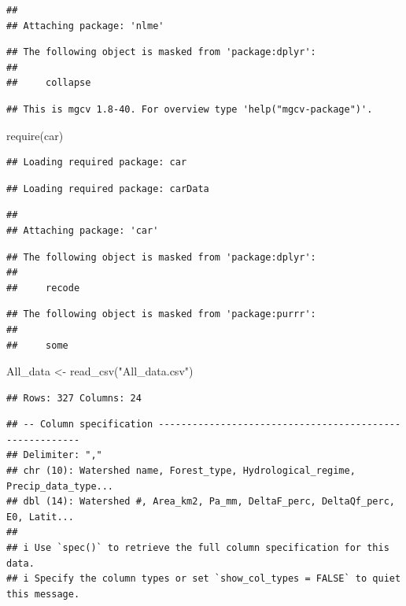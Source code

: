 \documentclass[]{elsarticle} %
\newenvironment{Shaded}{\begin{snugshade}}{\end{snugshade}}
\newcommand{\FunctionTok}[1]{\textcolor[rgb]{0.00,0.00,0.00}{#1}}
\newcommand{\NormalTok}[1]{#1}
\newcommand{\OtherTok}[1]{\textcolor[rgb]{0.56,0.35,0.01}{#1}}
\newcommand{\StringTok}[1]{\textcolor[rgb]{0.31,0.60,0.02}{#1}}
\begin{document}
\begin{verbatim}
## 
## Attaching package: 'nlme'
\end{verbatim}

\begin{verbatim}
## The following object is masked from 'package:dplyr':
## 
##     collapse
\end{verbatim}

\begin{verbatim}
## This is mgcv 1.8-40. For overview type 'help("mgcv-package")'.
\end{verbatim}

\begin{Shaded}
\begin{Highlighting}[]
\FunctionTok{require}\NormalTok{(car)}
\end{Highlighting}
\end{Shaded}

\begin{verbatim}
## Loading required package: car
\end{verbatim}

\begin{verbatim}
## Loading required package: carData
\end{verbatim}

\begin{verbatim}
## 
## Attaching package: 'car'
\end{verbatim}

\begin{verbatim}
## The following object is masked from 'package:dplyr':
## 
##     recode
\end{verbatim}

\begin{verbatim}
## The following object is masked from 'package:purrr':
## 
##     some
\end{verbatim}

\begin{Shaded}
\begin{Highlighting}[]
\NormalTok{All\_data }\OtherTok{\textless{}{-}} \FunctionTok{read\_csv}\NormalTok{(}\StringTok{"All\_data.csv"}\NormalTok{)}
\end{Highlighting}
\end{Shaded}

\begin{verbatim}
## Rows: 327 Columns: 24
\end{verbatim}

\begin{verbatim}
## -- Column specification --------------------------------------------------------
## Delimiter: ","
## chr (10): Watershed name, Forest_type, Hydrological_regime, Precip_data_type...
## dbl (14): Watershed #, Area_km2, Pa_mm, DeltaF_perc, DeltaQf_perc, E0, Latit...
## 
## i Use `spec()` to retrieve the full column specification for this data.
## i Specify the column types or set `show_col_types = FALSE` to quiet this message.
\end{verbatim}
\end{document}
